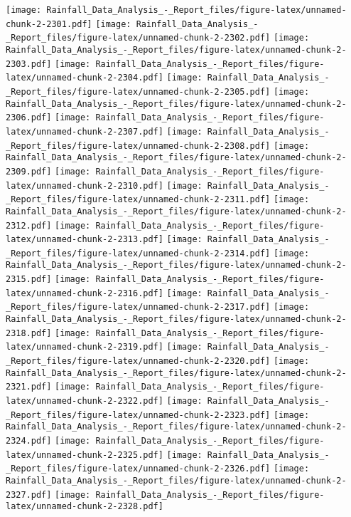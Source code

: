 \documentclass[
]{article}
\begin{document}
\texttt{[image: Rainfall\_Data\_Analysis\_-\_Report\_files/figure-latex/unnamed-chunk-2-2301.pdf]}
\texttt{[image: Rainfall\_Data\_Analysis\_-\_Report\_files/figure-latex/unnamed-chunk-2-2302.pdf]}
\texttt{[image: Rainfall\_Data\_Analysis\_-\_Report\_files/figure-latex/unnamed-chunk-2-2303.pdf]}
\texttt{[image: Rainfall\_Data\_Analysis\_-\_Report\_files/figure-latex/unnamed-chunk-2-2304.pdf]}
\texttt{[image: Rainfall\_Data\_Analysis\_-\_Report\_files/figure-latex/unnamed-chunk-2-2305.pdf]}
\texttt{[image: Rainfall\_Data\_Analysis\_-\_Report\_files/figure-latex/unnamed-chunk-2-2306.pdf]}
\texttt{[image: Rainfall\_Data\_Analysis\_-\_Report\_files/figure-latex/unnamed-chunk-2-2307.pdf]}
\texttt{[image: Rainfall\_Data\_Analysis\_-\_Report\_files/figure-latex/unnamed-chunk-2-2308.pdf]}
\texttt{[image: Rainfall\_Data\_Analysis\_-\_Report\_files/figure-latex/unnamed-chunk-2-2309.pdf]}
\texttt{[image: Rainfall\_Data\_Analysis\_-\_Report\_files/figure-latex/unnamed-chunk-2-2310.pdf]}
\texttt{[image: Rainfall\_Data\_Analysis\_-\_Report\_files/figure-latex/unnamed-chunk-2-2311.pdf]}
\texttt{[image: Rainfall\_Data\_Analysis\_-\_Report\_files/figure-latex/unnamed-chunk-2-2312.pdf]}
\texttt{[image: Rainfall\_Data\_Analysis\_-\_Report\_files/figure-latex/unnamed-chunk-2-2313.pdf]}
\texttt{[image: Rainfall\_Data\_Analysis\_-\_Report\_files/figure-latex/unnamed-chunk-2-2314.pdf]}
\texttt{[image: Rainfall\_Data\_Analysis\_-\_Report\_files/figure-latex/unnamed-chunk-2-2315.pdf]}
\texttt{[image: Rainfall\_Data\_Analysis\_-\_Report\_files/figure-latex/unnamed-chunk-2-2316.pdf]}
\texttt{[image: Rainfall\_Data\_Analysis\_-\_Report\_files/figure-latex/unnamed-chunk-2-2317.pdf]}
\texttt{[image: Rainfall\_Data\_Analysis\_-\_Report\_files/figure-latex/unnamed-chunk-2-2318.pdf]}
\texttt{[image: Rainfall\_Data\_Analysis\_-\_Report\_files/figure-latex/unnamed-chunk-2-2319.pdf]}
\texttt{[image: Rainfall\_Data\_Analysis\_-\_Report\_files/figure-latex/unnamed-chunk-2-2320.pdf]}
\texttt{[image: Rainfall\_Data\_Analysis\_-\_Report\_files/figure-latex/unnamed-chunk-2-2321.pdf]}
\texttt{[image: Rainfall\_Data\_Analysis\_-\_Report\_files/figure-latex/unnamed-chunk-2-2322.pdf]}
\texttt{[image: Rainfall\_Data\_Analysis\_-\_Report\_files/figure-latex/unnamed-chunk-2-2323.pdf]}
\texttt{[image: Rainfall\_Data\_Analysis\_-\_Report\_files/figure-latex/unnamed-chunk-2-2324.pdf]}
\texttt{[image: Rainfall\_Data\_Analysis\_-\_Report\_files/figure-latex/unnamed-chunk-2-2325.pdf]}
\texttt{[image: Rainfall\_Data\_Analysis\_-\_Report\_files/figure-latex/unnamed-chunk-2-2326.pdf]}
\texttt{[image: Rainfall\_Data\_Analysis\_-\_Report\_files/figure-latex/unnamed-chunk-2-2327.pdf]}
\texttt{[image: Rainfall\_Data\_Analysis\_-\_Report\_files/figure-latex/unnamed-chunk-2-2328.pdf]}
\end{document}
